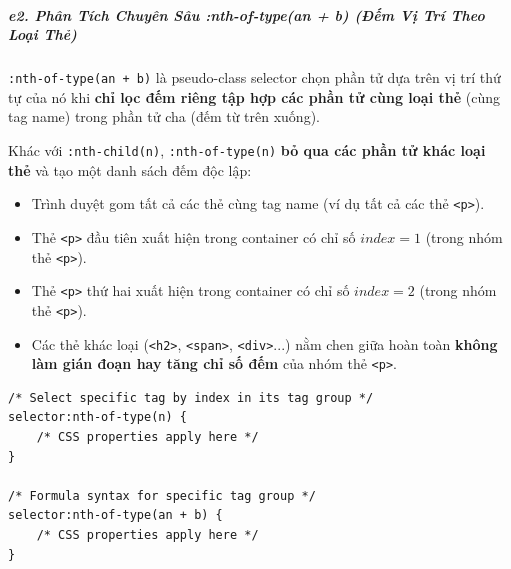 \documentclass[11pt,oneside]{book}
\newcommand{\codeinline}[1]{\textcolor{accentOrange}{\texttt{#1}}}
\begin{document}

\subparagraph{e2. Phân Tích Chuyên Sâu :nth-of-type(an + b) (Đếm Vị Trí Theo Loại Thẻ)}

\codeinline{:nth-of-type(an + b)} là pseudo-class selector chọn phần tử dựa trên vị trí thứ tự của nó khi \textbf{chỉ lọc đếm riêng tập hợp các phần tử cùng loại thẻ} (cùng tag name) trong phần tử cha (đếm từ trên xuống).

\begin{conceptBox}
Khác với \codeinline{:nth-child(n)}, \codeinline{:nth-of-type(n)} \textbf{bỏ qua các phần tử khác loại thẻ} và tạo một danh sách đếm độc lập:
\begin{itemize}[leftmargin=1.5em, itemsep=2pt, parsep=0pt]
    \item Trình duyệt gom tất cả các thẻ cùng tag name (ví dụ tất cả các thẻ \codeinline{<p>}).
    \item Thẻ \codeinline{<p>} đầu tiên xuất hiện trong container có chỉ số $index = 1$ (trong nhóm thẻ \codeinline{<p>}).
    \item Thẻ \codeinline{<p>} thứ hai xuất hiện trong container có chỉ số $index = 2$ (trong nhóm thẻ \codeinline{<p>}).
    \item Các thẻ khác loại (\codeinline{<h2>}, \codeinline{<span>}, \codeinline{<div>}...) nằm chen giữa hoàn toàn \textbf{không làm gián đoạn hay tăng chỉ số đếm} của nhóm thẻ \codeinline{<p>}.
\end{itemize}
\end{conceptBox}

\begin{codeWindow}
\begin{lstlisting}[language=CSS3]
/* Select specific tag by index in its tag group */
selector:nth-of-type(n) {
    /* CSS properties apply here */
}

/* Formula syntax for specific tag group */
selector:nth-of-type(an + b) {
    /* CSS properties apply here */
}
\end{lstlisting}
\end{codeWindow}
\end{document}
